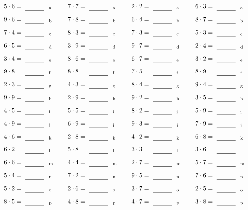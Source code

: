 \documentclass
[
  draft    = true,
  fontsize = 11pt,
  parskip  = half-
]
{scrartcl}
\begin{document}
\par\vfill\par
\begin{align*}
    \pline{5\cdot6}&=\rline{a}
  & \pline{7\cdot7}&=\rline{a}
  & \pline{2\cdot2}&=\rline{a}
  & \pline{6\cdot3}&=\rline{a} \\[1ex]
    \pline{9\cdot6}&=\rline{b}
  & \pline{7\cdot8}&=\rline{b}
  & \pline{6\cdot4}&=\rline{b}
  & \pline{8\cdot7}&=\rline{b} \\[1ex]
    \pline{7\cdot4}&=\rline{c}
  & \pline{8\cdot3}&=\rline{c}
  & \pline{7\cdot3}&=\rline{c}
  & \pline{5\cdot3}&=\rline{c} \\[1ex]
    \pline{6\cdot5}&=\rline{d}
  & \pline{3\cdot9}&=\rline{d}
  & \pline{9\cdot7}&=\rline{d}
  & \pline{2\cdot4}&=\rline{d} \\[1ex]
    \pline{3\cdot4}&=\rline{e}
  & \pline{8\cdot6}&=\rline{e}
  & \pline{6\cdot7}&=\rline{e}
  & \pline{3\cdot2}&=\rline{e} \\[1ex]
    \pline{9\cdot8}&=\rline{f}
  & \pline{8\cdot8}&=\rline{f}
  & \pline{7\cdot5}&=\rline{f}
  & \pline{8\cdot9}&=\rline{f} \\[1ex]
    \pline{2\cdot3}&=\rline{g}
  & \pline{4\cdot3}&=\rline{g}
  & \pline{8\cdot4}&=\rline{g}
  & \pline{9\cdot4}&=\rline{g} \\[1ex]
    \pline{9\cdot9}&=\rline{h}
  & \pline{2\cdot9}&=\rline{h}
  & \pline{9\cdot2}&=\rline{h}
  & \pline{3\cdot5}&=\rline{h} \\[1ex]
    \pline{4\cdot5}&=\rline{i}
  & \pline{5\cdot5}&=\rline{i}
  & \pline{8\cdot2}&=\rline{i}
  & \pline{5\cdot9}&=\rline{i} \\[1ex]
    \pline{4\cdot9}&=\rline{j}
  & \pline{6\cdot9}&=\rline{j}
  & \pline{9\cdot3}&=\rline{j}
  & \pline{7\cdot9}&=\rline{j} \\[1ex]
    \pline{4\cdot6}&=\rline{k}
  & \pline{2\cdot8}&=\rline{k}
  & \pline{4\cdot2}&=\rline{k}
  & \pline{6\cdot8}&=\rline{k} \\[1ex]
    \pline{6\cdot2}&=\rline{l}
  & \pline{5\cdot8}&=\rline{l}
  & \pline{3\cdot3}&=\rline{l}
  & \pline{3\cdot6}&=\rline{l} \\[1ex]
    \pline{6\cdot6}&=\rline{m}
  & \pline{4\cdot4}&=\rline{m}
  & \pline{2\cdot7}&=\rline{m}
  & \pline{5\cdot7}&=\rline{m} \\[1ex]
    \pline{5\cdot4}&=\rline{n}
  & \pline{7\cdot2}&=\rline{n}
  & \pline{9\cdot5}&=\rline{n}
  & \pline{7\cdot6}&=\rline{n} \\[1ex]
    \pline{5\cdot2}&=\rline{o}
  & \pline{2\cdot6}&=\rline{o}
  & \pline{3\cdot7}&=\rline{o}
  & \pline{2\cdot5}&=\rline{o} \\[1ex]
    \pline{8\cdot5}&=\rline{p}
  & \pline{4\cdot8}&=\rline{p}
  & \pline{4\cdot7}&=\rline{p}
  & \pline{3\cdot8}&=\rline{p}
\end{align*}
\end{document}
